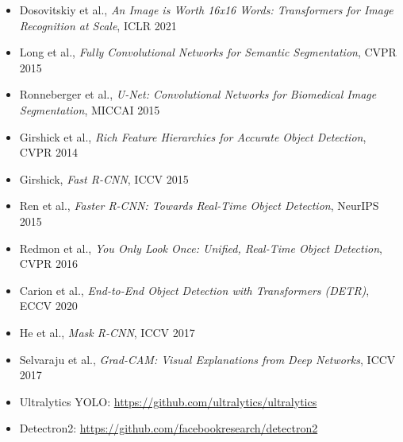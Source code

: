 \begin{itemize}
    \item Dosovitskiy et al., \textit{An Image is Worth 16x16 Words: Transformers for Image Recognition at Scale}, ICLR 2021
    \item Long et al., \textit{Fully Convolutional Networks for Semantic Segmentation}, CVPR 2015
    \item Ronneberger et al., \textit{U-Net: Convolutional Networks for Biomedical Image Segmentation}, MICCAI 2015
    \item Girshick et al., \textit{Rich Feature Hierarchies for Accurate Object Detection}, CVPR 2014
    \item Girshick, \textit{Fast R-CNN}, ICCV 2015
    \item Ren et al., \textit{Faster R-CNN: Towards Real-Time Object Detection}, NeurIPS 2015
    \item Redmon et al., \textit{You Only Look Once: Unified, Real-Time Object Detection}, CVPR 2016
    \item Carion et al., \textit{End-to-End Object Detection with Transformers (DETR)}, ECCV 2020
    \item He et al., \textit{Mask R-CNN}, ICCV 2017
    \item Selvaraju et al., \textit{Grad-CAM: Visual Explanations from Deep Networks}, ICCV 2017
    \item Ultralytics YOLO: \url{https://github.com/ultralytics/ultralytics}
    \item Detectron2: \url{https://github.com/facebookresearch/detectron2}
\end{itemize}


